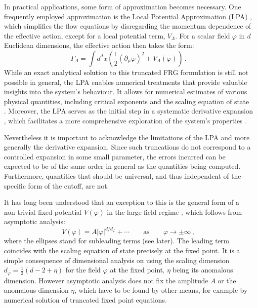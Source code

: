 \documentclass[11pt,a4paper]{article}
\numberwithin{figure}{section}
\numberwithin{equation}{section}
\newcommand{\be}{\begin{equation}}
\newcommand{\ee}{\end{equation}}
\newcommand{\ph}{\varphi}
\begin{document}
In practical applications, some form of approximation becomes necessary. One frequently employed approximation is the Local Potential Approximation (LPA) \cite{Nicoll:1974zz,Hasenfratz:1985dm,Felder:1987,Ball:1994ji,Morris:1994ki,Morris:1995af,Aoki:1996fn,Comellas:1997tf,Osborn:2009vs,Bervillier:2013hha}, which simplifies the flow equations by disregarding the momentum dependence of the effective action, except for a local potential term, $V_\Lambda$. For a scalar field $\ph$ in $d$ Euclidean dimensions, the effective action then takes the form:
\begin{equation}
    \Gamma_\Lambda=\int\!\! d^dx \left(\frac{1}{2}(\partial_\mu \ph)^2+ V_\Lambda(\ph)\right) \,.
\end{equation}
While an exact analytical solution to this truncated FRG formulation is still not possible in general, the LPA enables numerical treatments that provide valuable insights into the system's behaviour. It allows for numerical estimates of various physical quantities, including critical exponents and the scaling equation of state \cite{Morris:1994ki,Morris:1994ie,Morris:1996xq,Morris:1997xj,Morris:1998,Bagnuls:2000,Berges:2000ew,Pelissetto:2000ek,Rosten:2010vm,Dupuis:2020fhh}. Moreover, the LPA serves as the initial step in a systematic derivative expansion \cite{Morris:1994ki,Morris:1994ie,Morris:1996xq,Morris:1997xj,Morris:1998}, which facilitates a more comprehensive exploration of the system's properties \cite{Morris:1996xq,Morris:1998,Bagnuls:2000,Berges:2000ew,Pelissetto:2000ek,Rosten:2010vm,Dupuis:2020fhh}.

Nevertheless it is important to acknowledge the limitations of the LPA and more generally the derivative expansion. Since such truncations do not correspond to a controlled expansion in some small parameter, the errors incurred can be expected to be of the same order in general as the quantities being computed. Furthermore, quantities that should be universal, and thus independent of the specific form of the cutoff, are not.

It has long been understood that an exception to this is the general form of a non-trivial fixed potential $V(\ph)$ in the large field regime \cite{Morris:1994ki,Morris:1994ie,Morris:1997xj,Morris:1998}, which follows from asymptotic analysis:
\be \label{asympV} V(\ph) = A|\ph|^{d/d_\ph}+\cdots\qquad\text{as}\qquad \ph\to\pm\infty\,, \ee
where the ellipses stand for subleading terms (see later).
The leading term coincides with the scaling equation of state precisely at the fixed point. It is a simple consequence of dimensional analysis on using the scaling dimension $d_\ph =\frac12(d-2+\eta)$ for the field $\ph$ at the fixed point, $\eta$ being its anomalous dimension. However asymptotic analysis does not fix the amplitude
$A$ or the anomalous dimension $\eta$, which have to be found by other means, for example by numerical solution of truncated fixed point equations. 
\end{document}

